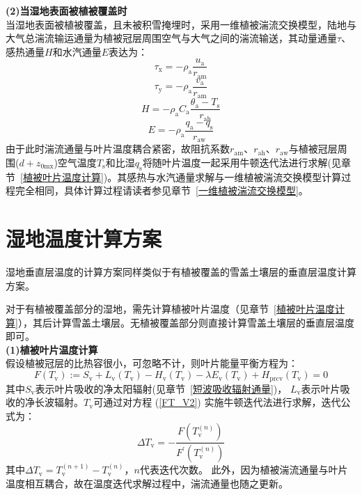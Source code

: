 \textbf {(2)当湿地表面被植被覆盖时}\\

当湿地表面被植被覆盖，且未被积雪掩埋时，采用一维植被湍流交换模型，陆地与大气总湍流输运通量为植被冠层周围空气与大气之间的湍流输送，其动量通量$\tau$、感热通量$H$和水汽通量$E$表达为：
\begin{equation}
  \tau_{\mathrm{x}}=-\rho_{\mathrm{a}} \frac{u_{\mathrm{a}}}{r_{\mathrm{a m}}}
\end{equation}
\begin{equation}
  \tau_{\mathrm{y}}=-\rho_{\mathrm{a}} \frac{v_{\mathrm{a}}}{r_{\mathrm{a m}}}
\end{equation}
\begin{equation}
  H=-\rho_{\mathrm{a}} C_{\mathrm{a}} \frac{\theta_{\mathrm{a}}-T_{\mathrm{s}}}{r_{\mathrm{a h}}}
\end{equation}
\begin{equation}
  E=-\rho_{\mathrm{a}} \frac{q_{\mathrm{a}}-q_{\mathrm{s}}}{r_{\mathrm{a w}}}
\end{equation}
由于此时湍流通量与叶片温度耦合紧密，故阻抗系数$r_{\mathrm{am}}$、$r_{\mathrm{ah}}$、$r_{\mathrm{aw}}$与植被冠层周围($d+z_{\mathrm{0mx}}$)空气温度$T_{\mathrm {s}} $和比湿$q_{\mathrm {s}} $将随叶片温度一起采用牛顿迭代法进行求解(见章节~\ref{植被叶片温度计算})。其感热与水汽通量求解与一维植被湍流交换模型计算过程完全相同，具体计算过程请读者参见章节~\ref{一维植被湍流交换模型}。

\section{湿地温度计算方案}
湿地垂直层温度的计算方案同样类似于有植被覆盖的雪盖土壤层的垂直层温度计算方案。

对于有植被覆盖部分的湿地，需先计算植被叶片温度（见章节~\ref{植被叶片温度计算}），其后计算雪盖土壤层。无植被覆盖部分则直接计算雪盖土壤层的垂直层温度即可。\\

\textbf {(1)植被叶片温度计算}\\

假设植被冠层的比热容很小，可忽略不计，则叶片能量平衡方程为：
\begin{equation}\label{FT_V2}
  F\left(T_{\mathrm{v}}\right):=S_{\mathrm{v}}+L_{\mathrm{v}}\left(T_{\mathrm{v}}\right)-H_{\mathrm{v}}\left(T_{\mathrm{v}}\right)-\lambda E_{\mathrm{v}}\left(T_{\mathrm{v}}\right)+H_{\mathrm{p r c v}}\left(T_{\mathrm{v}}\right)=0
\end{equation}
其中$S_{\mathrm {v}} $表示叶片吸收的净太阳辐射(见章节~\ref{短波吸收辐射通量})，
$L_{\mathrm {v}} $表示叶片吸收的净长波辐射。$T_{\mathrm {v}} $可通过对方程 (\ref{FT_V2}) 实施牛顿迭代法进行求解，迭代公式为：
\begin{equation}
  \Delta T_{\mathrm{v}}=-\frac{F\left(T_{\mathrm{v}}^{(n)}\right)}{F^{\prime}\left(T_{\mathrm{v}}^{(n)}\right)}
\end{equation}
其中$\Delta T_{\mathrm {v}} =T_{\mathrm {v}} ^{\left(n+1\right)}-T_{\mathrm {v}} ^{\left(n\right)}$，$n$代表迭代次数。
此外，因为植被湍流通量与叶片温度相互耦合，故在温度迭代求解过程中，湍流通量也随之更新。


